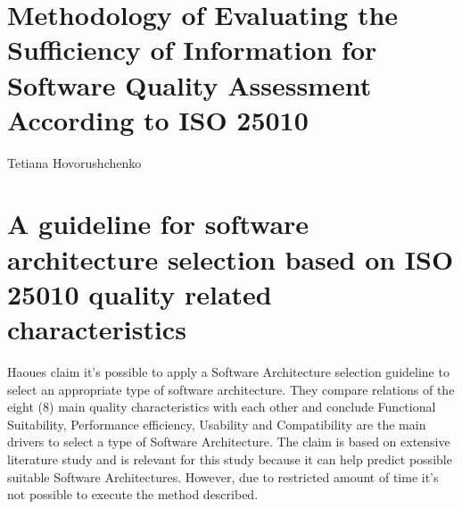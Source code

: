 \section*{Methodology of Evaluating the Sufficiency of Information for Software Quality Assessment According to ISO 25010}
Tetiana Hovorushchenko \cite{Hovorushchenko2018MethodologyOE}

\section*{A guideline for software architecture selection based on ISO 25010 quality related characteristics}
Haoues \etal \cite{Haoues2017AGF} claim it's possible to apply a Software Architecture selection guideline to select an appropriate type of software architecture. They compare relations of the eight (8) main quality characteristics with each other and conclude Functional Suitability, Performance efficiency, Usability and Compatibility are the main drivers to select a type of Software Architecture. The claim is based on extensive literature study and is relevant for this study because it can help predict possible suitable Software Architectures. However, due to restricted amount of time it's not possible to execute the method described. 